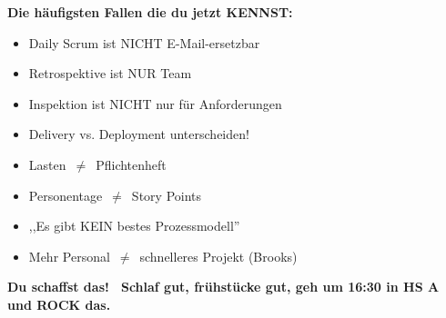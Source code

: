 \documentclass[11pt,a4paper]{article}
\begin{document}
\begin{merkhilfe}
\textbf{Die häufigsten Fallen die du jetzt KENNST:}
\begin{itemize}
  \item Daily Scrum ist NICHT E-Mail-ersetzbar
  \item Retrospektive ist NUR Team
  \item Inspektion ist NICHT nur für Anforderungen
  \item Delivery vs. Deployment unterscheiden!
  \item Lasten \,$\neq$\, Pflichtenheft
  \item Personentage \,$\neq$\, Story Points
  \item ,,Es gibt KEIN bestes Prozessmodell''
  \item Mehr Personal \,$\neq$\, schnelleres Projekt (Brooks)
\end{itemize}
\end{merkhilfe}

\vspace{1cm}

\begin{tldr}
\textbf{Du schaffst das! \, Schlaf gut, frühstücke gut, geh um 16:30 in HS A und ROCK das.}
\end{tldr}
\end{document}
